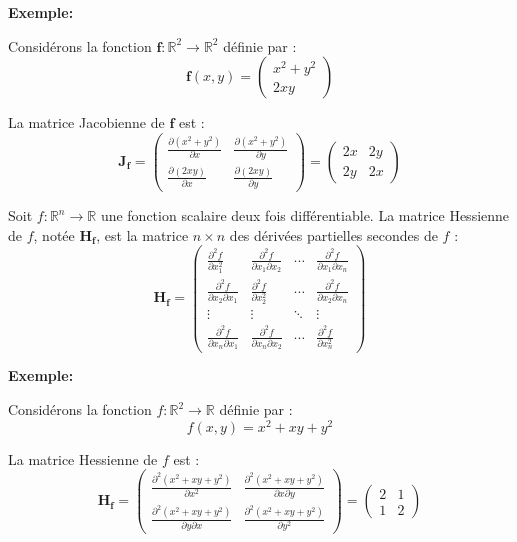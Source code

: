 \textbf{Exemple:}

Considérons la fonction $\mathbf{f} : \mathbb{R}^2 \to \mathbb{R}^2$ définie par :
\[
\mathbf{f}(x, y) = \begin{pmatrix}
x^2 + y^2 \\
2xy
\end{pmatrix}
\]

La matrice Jacobienne de $\mathbf{f}$ est :
\[
\mathbf{J_f} = \begin{pmatrix}
\frac{\partial (x^2 + y^2)}{\partial x} & \frac{\partial (x^2 + y^2)}{\partial y} \\
\frac{\partial (2xy)}{\partial x} & \frac{\partial (2xy)}{\partial y}
\end{pmatrix}
= \begin{pmatrix}
2x & 2y \\
2y & 2x
\end{pmatrix}
\]



Soit $f : \mathbb{R}^n \to \mathbb{R}$ une fonction scalaire deux fois différentiable. La matrice Hessienne de $f$, notée $\mathbf{H_f}$, est la matrice $n \times n$ des dérivées partielles secondes de $f$ :
\[
\mathbf{H_f} = \begin{pmatrix}
\frac{\partial^2 f}{\partial x_1^2} & \frac{\partial^2 f}{\partial x_1 \partial x_2} & \cdots & \frac{\partial^2 f}{\partial x_1 \partial x_n} \\
\frac{\partial^2 f}{\partial x_2 \partial x_1} & \frac{\partial^2 f}{\partial x_2^2} & \cdots & \frac{\partial^2 f}{\partial x_2 \partial x_n} \\
\vdots & \vdots & \ddots & \vdots \\
\frac{\partial^2 f}{\partial x_n \partial x_1} & \frac{\partial^2 f}{\partial x_n \partial x_2} & \cdots & \frac{\partial^2 f}{\partial x_n^2}
\end{pmatrix}
\]

\textbf{Exemple:}

Considérons la fonction $f : \mathbb{R}^2 \to \mathbb{R}$ définie par :
\[
f(x, y) = x^2 + xy + y^2
\]

La matrice Hessienne de $f$ est :
\[
\mathbf{H_f} = \begin{pmatrix}
\frac{\partial^2 (x^2 + xy + y^2)}{\partial x^2} & \frac{\partial^2 (x^2 + xy + y^2)}{\partial x \partial y} \\
\frac{\partial^2 (x^2 + xy + y^2)}{\partial y \partial x} & \frac{\partial^2 (x^2 + xy + y^2)}{\partial y^2}
\end{pmatrix}
= \begin{pmatrix}
2 & 1 \\
1 & 2
\end{pmatrix}
\]

